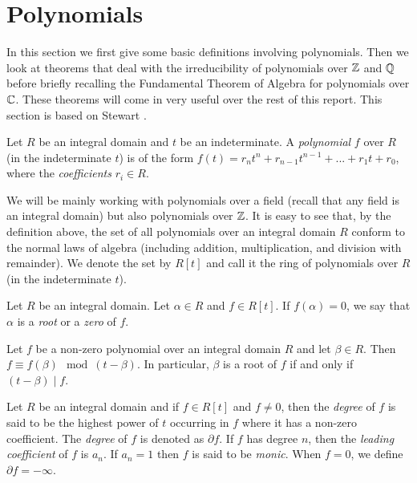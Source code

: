 

\section{Polynomials} \label{sec:poly}
In this section we first give some basic definitions involving polynomials. Then we look at theorems that deal with the irreducibility of polynomials over $\mathbb Z$ and $\mathbb Q$ before briefly recalling the Fundamental Theorem of Algebra for polynomials over $\mathbb C$. These theorems will come in very useful over the rest of this report. This section is based on Stewart \cite[Chapters~2-3]{Stewart}. 

\begin{definition}
    Let $R$ be an integral domain and $t$ be an indeterminate. A \textit{polynomial} $f$ over $R$ (in the indeterminate $t$) is of the form $f(t) = r_n t^n + r_{n-1} t^{n-1} + ... + r_1 t + r_0$, where the \textit{coefficients} $r_i \in R$. 
\end{definition}

We will be mainly working with polynomials over a field (recall that any field is an integral domain) but also polynomials over $\mathbb Z$. It is easy to see that, by the definition above, the set of all polynomials over an integral domain $R$ conform to  the normal laws of algebra (including addition, multiplication, and division with remainder). We denote the set by $R[t]$ and call it the ring of polynomials over $R$ (in the indeterminate $t$). 

\begin{definition}
	Let $R$ be an integral domain. Let $\alpha \in R$ and $f \in R[t]$. If $f(\alpha) = 0$, we say that $\alpha$ is a \textit{root} or a \textit{zero} of $f$. 
\end{definition}

\begin{theorem} \label{thm:remainder}
	Let $f$ be a non-zero polynomial over an integral domain $R$ and let $\beta \in R$. Then $f \equiv f(\beta) \mod (t - \beta)$. 
	In particular, $\beta$ is a root of $f$ if and only if $(t - \beta) \mid f$. 
\end{theorem}


\begin{definition}
    Let $R$ be an integral domain and if $f \in R[t]$ and $f \neq 0$, then the \textit{degree} of $f$ is said to be the highest power of $t$ occurring in $f$ where it has a non-zero coefficient. The \textit{degree} of $f$ is denoted as $\partial f$. If $f$ has degree $n$, then the \textit{leading coefficient} of $f$ is $a_n$. If $a_n = 1$ then $f$ is said to be \textit{monic}. When $f = 0$, we define $\partial f = - \infty$.
\end{definition}


